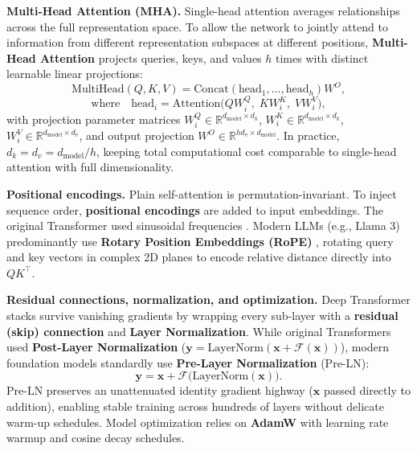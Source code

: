 \documentclass[11pt,a4paper]{article}
\begin{document}
	\begin{practicebox}

	\end{practicebox}

	\textbf{Multi-Head Attention (MHA).} Single-head attention averages relationships across the full representation space. To allow the network to jointly attend to information from different representation subspaces at different positions, \textbf{Multi-Head Attention} \parencite{vaswani2017} projects queries, keys, and values $h$ times with distinct learnable linear projections:
	\begin{equation}
		\mathrm{MultiHead}(Q, K, V) = \mathrm{Concat}(\mathrm{head}_1, \dots, \mathrm{head}_h) W^O,
	\end{equation}
	\begin{equation}
		\text{where}\quad \mathrm{head}_i = \mathrm{Attention}\bigl(Q W_i^Q,\; K W_i^K,\; V W_i^V\bigr),
	\end{equation}
	with projection parameter matrices $W_i^Q \in \mathbb{R}^{d_{\text{model}} \times d_k}$, $W_i^K \in \mathbb{R}^{d_{\text{model}} \times d_k}$, $W_i^V \in \mathbb{R}^{d_{\text{model}} \times d_v}$, and output projection $W^O \in \mathbb{R}^{h d_v \times d_{\text{model}}}$. In practice, $d_k = d_v = d_{\text{model}} / h$, keeping total computational cost comparable to single-head attention with full dimensionality.

	\begin{practicebox}

	\end{practicebox}

	\textbf{Positional encodings.} Plain self-attention is permutation-invariant. To inject sequence order, \textbf{positional encodings} are added to input embeddings. The original Transformer used sinusoidal frequencies \parencite{vaswani2017}. Modern LLMs (e.g., Llama 3) predominantly use \textbf{Rotary Position Embeddings (RoPE)} \parencite{su2024}, rotating query and key vectors in complex 2D planes to encode relative distance directly into $Q K^\top$.

	\textbf{Residual connections, normalization, and optimization.} Deep Transformer stacks survive vanishing gradients by wrapping every sub-layer with a \textbf{residual (skip) connection} \parencite{he2016} and \textbf{Layer Normalization}. While original Transformers used \textbf{Post-Layer Normalization} ($\mathbf{y} = \mathrm{LayerNorm}(\mathbf{x} + \mathcal{F}(\mathbf{x}))$), modern foundation models standardly use \textbf{Pre-Layer Normalization} (Pre-LN):
	\begin{equation}
		\mathbf{y} = \mathbf{x} + \mathcal{F}\bigl(\mathrm{LayerNorm}(\mathbf{x})\bigr).
	\end{equation}
	Pre-LN preserves an unattenuated identity gradient highway ($\mathbf{x}$ passed directly to addition), enabling stable training across hundreds of layers without delicate warm-up schedules. Model optimization relies on \textbf{AdamW} \parencite{loshchilov2019} with learning rate warmup and cosine decay schedules.
\end{document}
